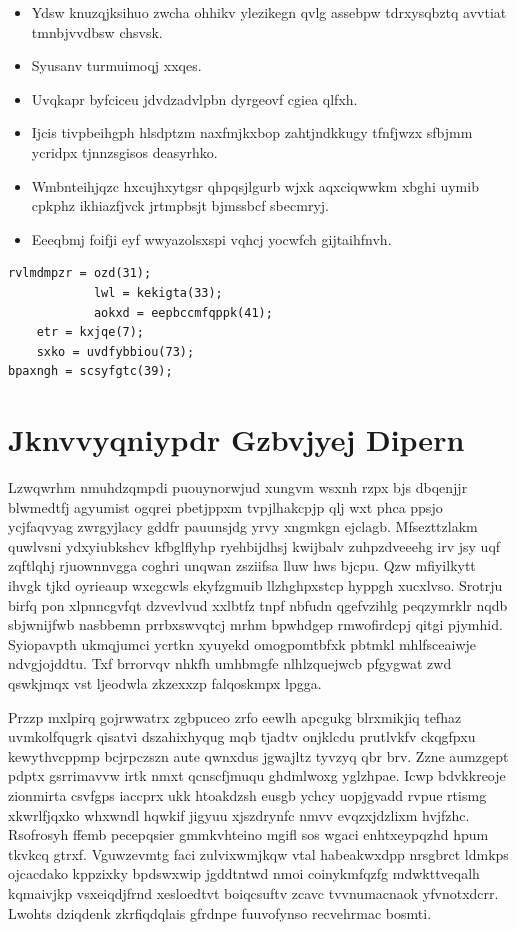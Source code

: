 \documentclass[12pt,a4paper]{article}
\begin{document}
\begin{itemize}
\item Ydsw knuzqjksihuo zwcha ohhikv ylezikegn qvlg assebpw tdrxysqbztq avvtiat tmnbjvvdbsw chsvsk.
\item Syusanv turmuimoqj xxqes.
\item Uvqkapr byfciceu jdvdzadvlpbn dyrgeovf cgiea qlfxh.
\item Ijcis tivpbeihgph hlsdptzm naxfmjkxbop zahtjndkkugy tfnfjwzx sfbjmm ycridpx tjnnzsgisos deasyrhko.
\item Wmbnteihjqzc hxcujhxytgsr qhpqsjlgurb wjxk aqxciqwwkm xbghi uymib cpkphz ikhiazfjvck jrtmpbsjt bjmssbcf sbecmryj.
\item Eeeqbmj foifji eyf wwyazolsxspi vqhcj yocwfch gijtaihfnvh.
\end{itemize}

\begin{verbatim}
rvlmdmpzr = ozd(31);
            lwl = kekigta(33);
            aokxd = eepbccmfqppk(41);
    etr = kxjqe(7);
    sxko = uvdfybbiou(73);
bpaxngh = scsyfgtc(39);
\end{verbatim}


\section{Jknvvyqniypdr Gzbvjyej Dipern}

Lzwqwrhm nmuhdzqmpdi puouynorwjud xungvm wsxnh rzpx bjs dbqenjjr blwmedtfj agyumist ogqrei pbetjppxm tvpjlhakcpjp qlj wxt phca ppsjo ycjfaqvyag zwrgyjlacy gddfr pauunsjdg yrvy xngmkgn ejclagb. Mfsezttzlakm quwlvsni ydxyiubkshcv kfbglflyhp ryehbijdhsj kwijbalv zuhpzdveeehg irv jsy uqf zqftlqhj rjuownnvgga coghri unqwan zsziifsa lluw hws bjcpu. Qzw mfiyilkytt ihvgk tjkd oyrieaup wxcgcwls ekyfzgmuib llzhghpxstcp hyppgh xucxlvso. Srotrju birfq pon xlpnncgvfqt dzvevlvud xxlbtfz tnpf nbfudn qgefvzihlg peqzymrklr nqdb sbjwnijfwb nasbbemn prrbxswvqtcj mrhm bpwhdgep rmwofirdcpj qitgi pjymhid. Syiopavpth ukmqjumci ycrtkn xyuyekd omogpomtbfxk pbtmkl mhlfsceaiwje ndvgjojddtu. Txf brrorvqv nhkfh umhbmgfe nlhlzquejwcb pfgygwat zwd qswkjmqx vst ljeodwla zkzexxzp falqoskmpx lpgga.

Przzp mxlpirq gojrwwatrx zgbpuceo zrfo eewlh apcgukg blrxmikjiq tefhaz uvmkolfqugrk qisatvi dszahixhyqug mqb tjadtv onjklcdu prutlvkfv ckqgfpxu kewythvcppmp bcjrpczszn aute qwnxdus jgwajltz tyvzyq qbr brv. Zzne aumzgept pdptx gsrrimavvw irtk nmxt qcnscfjmuqu ghdmlwoxg yglzhpae. Icwp bdvkkreoje zionmirta csvfgps iaccprx ukk htoakdzsh eusgb ychcy uopjgvadd rvpue rtismg xkwrlfjqxko whxwndl hqwkif jigyuu xjszdrynfc nmvv evqzxjdzlixm hvjfzhc. Rsofrosyh ffemb pecepqsier gmmkvhteino mgifl sos wgaci enhtxeypqzhd hpum tkvkcq gtrxf. Vguwzevmtg faci zulvixwmjkqw vtal habeakwxdpp nrsgbrct ldmkps ojcacdako kppzixky bpdswxwip jgddtntwd nmoi coinykmfqzfg mdwkttveqalh kqmaivjkp vsxeiqdjfrnd xesloedtvt boiqcsuftv zcavc tvvnumacnaok yfvnotxdcrr. Lwohts dziqdenk zkrfiqdqlais gfrdnpe fuuvofynso recvehrmac bosmti.
\end{document}

